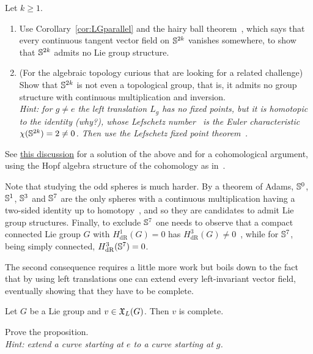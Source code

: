 \begin{exercise}\label{exe:noLGeven}
	Let $k\geq1$.
	\begin{enumerate}
		\item Use Corollary~\ref{cor:LGparallel} and the hairy ball theorem~\cite[Theorem 2.28]{book:hatcher}, which says that every continuous tangent vector field on $\mathbb{S}^{2k}$ vanishes somewhere, to show that $\mathbb{S}^{2k}$ admits no Lie group structure.
		\item (For the algebraic topology curious that are looking for a related challenge) Show that $\mathbb{S}^{2k}$ is not even a topological group, that is, it admits no group structure with continuous multiplication and inversion.\\
		\textit{\small Hint: for $g\neq e$ the left translation $L_g$ has no fixed points, but it is homotopic to the identity (why?), whose Lefschetz number~\cite[p. 179] {book:hatcher} is the Euler characteristic~\cite[p. 146]{book:hatcher} $\chi(\mathbb{S}^{2k})=2\neq0$. Then use the Lefschetz fixed point theorem~\cite[Theorem 2C.3]{book:hatcher}.}
	\end{enumerate}
	See \href{https://math.stackexchange.com/questions/829928}{this discussion} for a solution of the above and for a cohomological argument, using the Hopf algebra structure of the cohomology as in~\cite[Example 3C.2]{book:hatcher}.

	Note that studying the odd spheres is much harder. By a theorem of Adams, $\mathbb{S}^0$, $\mathbb{S}^1$, $\mathbb{S}^3$ and $\mathbb{S}^7$ are the only spheres with a continuous multiplication having a two-sided identity up to homotopy~\cite[Section 3.C]{book:hatcher}, and so they are candidates to admit Lie group structures. Finally, to exclude $\mathbb{S}^7$ one needs to observe that a compact connected Lie group $G$ with $H^1_{\mathrm{dR}}(G) = 0$ has $H^3_{\mathrm{dR}}(G)\neq 0$~\cite[Sections 2.1 and 3]{article:lauretwill:harmonic3}, while for $\mathbb{S}^7$, being simply connected, $H^3_{\mathrm{dR}}(\mathbb{S}^7) = 0$.
\end{exercise}

The second consequence requires a little more work but boils down to the fact that by using left translations one can extend every left-invariant vector field, eventually showing that they have to be complete.

\begin{proposition}\label{prop:XLcomplete}
	Let $G$ be a Lie group and $v\in\mathfrak{X}_L(G)$.
	Then $v$ is complete.
\end{proposition}
\begin{exercise}
	Prove the proposition.\\
	\textit{\small Hint: extend a curve starting at $e$ to a curve starting at $g$.}
\end{exercise}

